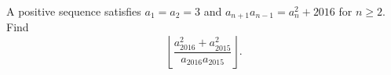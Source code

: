 A positive sequence satisfies $a_1=a_2=3$ and $a_{n+1}a_{n-1}=a_n^2+2016$ for $n\ge2$. Find
\[
\left\lfloor\dfrac{a_{2016}^2+a_{2015}^2}{a_{2016}a_{2015}}\right\rfloor.
\]
